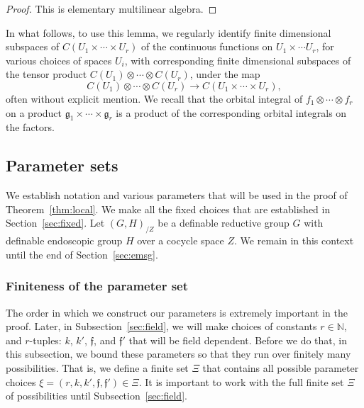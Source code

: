 \documentclass[12pt]{amsart}
\newcommand{\ring}[1]{{\mathbb #1}}
\def\s{{\mathfrak{f}}}
\newcommand{\fg}{\mathfrak{g}}
\theoremstyle{plain}
\theoremstyle{definition}
\begin{document}
\begin{proof} This is elementary multilinear algebra.
\end{proof}


In what follows, to use this lemma, we regularly identify finite
dimensional subspaces of $C(U_1\times\cdots\times U_r)$ of the
continuous functions on $U_1\times\cdots U_r$, for various choices of spaces
$U_i$, with corresponding finite dimensional subspaces of the tensor
product $C(U_1)\otimes \cdots\otimes C(U_r)$, under the map
\[
C(U_1)\otimes \cdots\otimes C(U_r)\to C(U_1\times\cdots\times U_r),
\]
often without explicit mention.  We recall that the orbital integral
of $f_1\otimes\cdots\otimes f_r$ on a product
$\fg_1\times\cdots\times \fg_r$ is a product of the corresponding
orbital integrals on the factors.

\subsection{Parameter sets}

We establish notation and various parameters that will be used in
the proof of Theorem~\ref{thm:local}.  We make all the fixed choices
that are established in Section~\ref{sec:fixed}.  Let $(G,H)_{/Z}$ be
a definable reductive group $G$ with definable endoscopic group $H$
over a cocycle space $Z$.  We remain in this context until the end of
Section~\ref{sec:emsg}.


\subsubsection{Finiteness of the parameter set}\label{sec:finiteness}

The order in which we construct our parameters is extremely important
in the proof.  Later, in Subsection~\ref{sec:field}, we will make
choices of constants $r\in\ring{N}$, and $r$-tuples: $k$, $k'$, $\s$,
and $\s'$ that will be field dependent.  Before we do that, in this
subsection, we bound these parameters so that they run over finitely
many possibilities.  That is, we define a finite set $\Xi$ that
contains all possible parameter choices $\xi=(r,k,k',\s,\s')\in\Xi$.
It is important to work with the full finite set $\Xi$ of
possibilities until Subsection~\ref{sec:field}.
\end{document}
